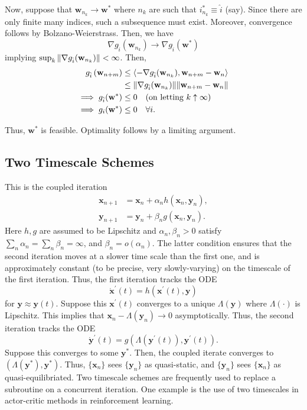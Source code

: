 Now, suppose that $\mathbf{w}_{n_k} \to \mathbf{w}^*$ where $n_k$ are such that $i^*_{n_k} \equiv \hat{i}$ (say). Since there are only finite many indices, such a subsequence must exist. Moreover, convergence follows by Bolzano-Weierstrass. Then, we have
\[
    \nabla g_{\hat{i}}(\mathbf{w}_{n_k}) \to \nabla g_{\hat{i}}(\mathbf{w}^*)
\]
implying $\sup_k \norm{\nabla g_{\hat{i}}(\mathbf{w}_{n_k})} < \infty$. Then, 
\begin{align*}
    g_{\hat{i}}\left( \mathbf{w}_{n+m} \right) &\leq \left\langle -\nabla g_{\hat{i}}(\mathbf{w}_{n_k}),   \mathbf{w}_{n+m} - \mathbf{w}_n \right\rangle \\
    &\leq \norm{\nabla g_{\hat{i}}(\mathbf{w}_{n_k})} \norm{\mathbf{w}_{n+m} - \mathbf{w}_n} \\
    \implies g_{\hat{i}}(\mathbf{w}^*) &\leq 0 \quad (\text{on letting } k \uparrow \infty) \\
    \implies g_i(\mathbf{w}^*) &\leq 0 \quad \forall i. 
\end{align*}

Thus, $\mathbf{w}^*$ is feasible. Optimality follows by a limiting argument. 

\subsection*{Two Timescale Schemes}

This is the coupled iteration
\begin{align*}
    \mathbf{x}_{n+1} &= \mathbf{x}_n + \alpha_n h(\mathbf{x}_n, \mathbf{y}_n), \\
    \mathbf{y}_{n+1} &= \mathbf{y}_n + \beta_n g(\mathbf{x}_n, \mathbf{y}_n).
\end{align*}
Here $h,g$ are assumed to be Lipschitz and $\alpha_n, \beta_n > 0$ satisfy $\sum_n \alpha_n = \sum_n \beta_n = \infty$, and $\beta_n = o(\alpha_n)$. The latter condition ensures that the second iteration moves at a slower time scale than the first one, and is approximately constant (to be precise, very slowly-varying) on the timescale of the first iteration. Thus, the first iteration tracks the ODE
\[
    \Dot{\mathbf{x}}^{\prime}(t) = h( \mathbf{x}^{\prime}(t), \mathbf{y})
\]
for $\mathbf{y} \approx \mathbf{y}(t)$. Suppose this $\mathbf{x}^{\prime}(t)$ converges to a unique $\Lambda(\mathbf{y})$ where $\Lambda(\cdot)$ is Lipschitz. This implies that $\mathbf{x}_n - \Lambda(\mathbf{y}_n) \to 0$ asymptotically. Thus, the second iteration tracks the ODE
\[
    \Dot{\mathbf{y}}^{\prime}(t) = g\left( \Lambda(\mathbf{y}^{\prime}(t)), \mathbf{y}^{\prime}(t) \right).
\]
Suppose this converges to some $\mathbf{y}^*$. Then, the coupled iterate converges to $(\Lambda(\mathbf{y}^*), \mathbf{y}^*)$. Thus, $\{\mathbf{x}_n\}$ sees $\{\mathbf{y}_n\}$ as quasi-static, and $\{\mathbf{y}_n\}$ sees $\{\mathbf{x}_n\}$ as quasi-equilibriated. Two timescale schemes are frequently used to replace a subroutine on a concurrent iteration. One example is the use of two timescales in actor-critic methods in reinforcement learning.

